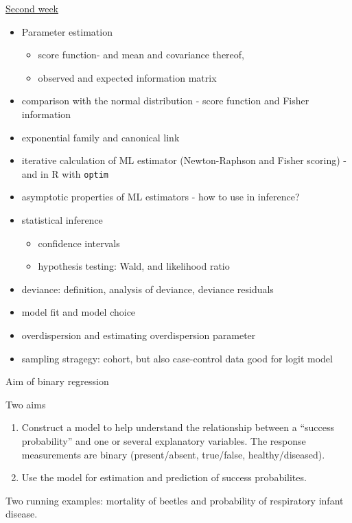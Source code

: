 \documentclass[
  ignorenonframetext,
]{beamer}
\providecommand{\tightlist}{%
  \setlength{\itemsep}{0pt}\setlength{\parskip}{0pt}}
\begin{document}
\begin{frame}[fragile]
\begin{block}{\hyperlink{secondweek}{Second week}}
\label{second-week}
\begin{itemize}
\tightlist
\item
  Parameter estimation

  \begin{itemize}
  \tightlist
  \item
    score function- and mean and covariance thereof,
  \item
    observed and expected information matrix
  \end{itemize}
\item
  comparison with the normal distribution - score function and Fisher
  information
\item
  exponential family and canonical link
\item
  iterative calculation of ML estimator (Newton-Raphson and Fisher
  scoring) - and in R with \texttt{optim}
\item
  asymptotic properties of ML estimators - how to use in inference?
\item
  statistical inference

  \begin{itemize}
  \tightlist
  \item
    confidence intervals
  \item
    hypothesis testing: Wald, and likelihood ratio
  \end{itemize}
\item
  deviance: definition, analysis of deviance, deviance residuals
\item
  model fit and model choice
\item
  overdispersion and estimating overdispersion parameter
\item
  sampling stragegy: cohort, but also case-control data good for logit
  model
\end{itemize}
\end{block}
\end{frame}

\begin{frame}{Aim of binary regression}
\label{aim-of-binary-regression}
\begin{block}{Two aims}
\label{two-aims}
\begin{enumerate}
\tightlist
\item
  Construct a model to help understand the relationship between a
  ``success probability'' and one or several explanatory variables. The
  response measurements are binary (present/absent, true/false,
  healthy/diseased).
\item
  Use the model for estimation and prediction of success probabilites.
\end{enumerate}

Two running examples: mortality of beetles and probability of
respiratory infant disease.
\end{block}
\end{frame}
\end{document}
